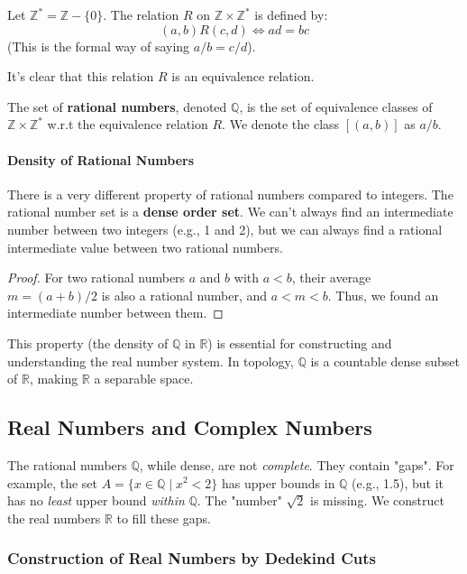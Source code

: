 \documentclass[oneside]{book}
\begin{document}
\begin{definition}
Let $\mathbb{Z}^* = \mathbb{Z} - \{0\}$. The relation $R$ on $\mathbb{Z} \times \mathbb{Z}^*$ is defined by:
$$ (a,b) R (c,d) \iff ad = bc $$
(This is the formal way of saying $a/b = c/d$).
\end{definition}
It’s clear that this relation $R$ is an equivalence relation.

\begin{definition}
The set of \textbf{rational numbers}, denoted $\mathbb{Q}$, is the set of equivalence classes of $\mathbb{Z} \times \mathbb{Z}^*$ w.r.t the equivalence relation $R$. We denote the class $[(a,b)]$ as $a/b$.
\end{definition}

\paragraph{Density of Rational Numbers}
There is a very different property of rational numbers compared to integers. The rational number set is a \textbf{dense order set}. We can’t always find an intermediate number between two integers (e.g., 1 and 2), but we can always find a rational intermediate value between two rational numbers.
\begin{proof}
For two rational numbers $a$ and $b$ with $a < b$, their average $m = (a+b)/2$ is also a rational number, and $a < m < b$. Thus, we found an intermediate number between them.
\end{proof}
This property (the density of $\mathbb{Q}$ in $\mathbb{R}$) is essential for constructing and understanding the real number system. In topology, $\mathbb{Q}$ is a countable dense subset of $\mathbb{R}$, making $\mathbb{R}$ a separable space.

\subsection{Real Numbers and Complex Numbers}
The rational numbers $\mathbb{Q}$, while dense, are not \emph{complete}. They contain "gaps". For example, the set $A = \{ x \in \mathbb{Q} \mid x^2 < 2 \}$ has upper bounds in $\mathbb{Q}$ (e.g., 1.5), but it has no \emph{least} upper bound \emph{within} $\mathbb{Q}$. The "number" $\sqrt{2}$ is missing. We construct the real numbers $\mathbb{R}$ to fill these gaps.

\subsubsection{Construction of Real Numbers by Dedekind Cuts}
\end{document}
